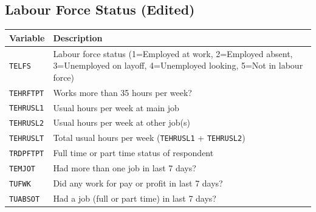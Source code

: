 \documentclass[11pt, a4paper]{article}
\begin{document}
\subsection{Labour Force Status (Edited)}
\begin{longtable}{L{3.5cm} L{12cm}}
\toprule \textbf{Variable} & \textbf{Description} \\ \midrule \endhead
\bottomrule \endfoot
\texttt{TELFS}    & Labour force status (1=Employed at work, 2=Employed absent,
                    3=Unemployed on layoff, 4=Unemployed looking, 5=Not in labour
                    force) \\
 \texttt{TEHRFTPT} & Works more than 35 hours per week? \\
\texttt{TEHRUSL1} & Usual hours per week at main job \\
 \texttt{TEHRUSL2} & Usual hours per week at other job(s) \\
\texttt{TEHRUSLT} & Total usual hours per week (\texttt{TEHRUSL1} +
                    \texttt{TEHRUSL2}) \\
 \texttt{TRDPFTPT} & Full time or part time status of respondent \\
\texttt{TEMJOT}   & Had more than one job in last 7 days? \\
 \texttt{TUFWK}    & Did any work for pay or profit in last 7 days? \\
\texttt{TUABSOT}  & Had a job (full or part time) in last 7 days? \\
\end{longtable}

\end{document}
